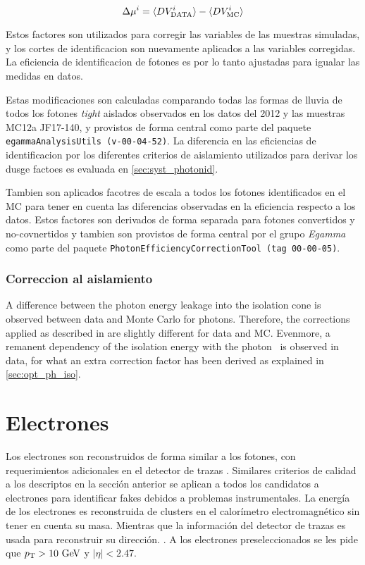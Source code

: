 \begin{equation}
  \Delta \mu^i = \langle DV^i_\text{DATA} \rangle - \langle DV^i_\mathrm{MC} \rangle
\end{equation}

Estos factores son utilizados para corregir las variables de las
muestras simuladas, y los cortes de identificacion son nuevamente
aplicados a las variables corregidas. La eficiencia de identificacion
de fotones es por lo tanto ajustadas para igualar las medidas en datos.

Estas modificaciones son calculadas comparando todas las formas de lluvia
de todos los fotones \emph{tight} aislados observados en los datos del 2012
y las muestras MC12a JF17-140, y provistos de forma central como parte del
paquete \texttt{egammaAnalysisUtils (v-00-04-52)}.
La diferencia en las eficiencias de identificacion por los diferentes
criterios de aislamiento utilizados para derivar los dusge factoes es
evaluada en \cref{sec:syst_photonid}.

Tambien son aplicados facotres de escala a todos los fotones identificados
en el MC para tener en cuenta las diferencias observadas en la eficiencia
respecto a los datos. Estos factores son derivados de forma separada para
fotones convertidos y no-covnertidos y tambien son provistos de forma central
por el grupo \emph{Egamma} como parte del paquete
\texttt{PhotonEfficiencyCorrectionTool (tag 00-00-05)}.

\subsubsection{Correccion al aislamiento}

A difference between the photon energy leakage into the isolation cone is
observed between data and Monte Carlo for photons. Therefore, the
corrections applied as described in \cite{Hance:1379530} are slightly
different for data and MC. Evenmore, a remanent dependency of the isolation
energy with the photon \pt\ is observed in data, for what an extra correction factor
has been derived as explained in \cref{sec:opt_ph_iso}.

\section{Electrones}
\label{sec:elec_obj}

Los electrones son reconstruidos de forma similar a los fotones, con
requerimientos adicionales en el detector de trazas \cite{Aad:2011mk}.
Similares criterios de calidad a los descriptos en la sección anterior
se aplican a todos los candidatos a electrones  para identificar fakes
debidos a problemas instrumentales.
La energía de los electrones es reconstruida de clusters en el calorímetro
electromagnético sin tener en cuenta su masa. Mientras que la información
del detector de trazas es usada para reconstruir su dirección.  \cite{EGScaleTwiki}.
A los electrones preseleccionados se les pide que $\pt>10\gev$ y $|\eta|<2.47$.

